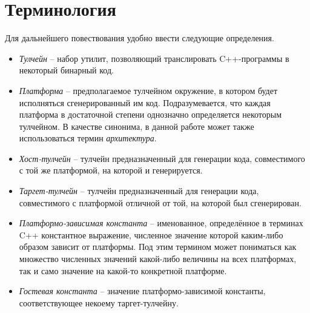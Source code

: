 \section{Терминология}
Для дальнейшего повествования удобно ввести следующие определения.

\begin{itemize}
    \item
        \textit{Тулчейн} -- набор утилит, позволяющий транслировать C++-программы в некоторый бинарный код.
    \item
        \textit{Платформа} -- предполагаемое тулчейном окружение, в котором будет исполняться сгенерированный им код. Подразумевается, что каждая платформа в достаточной степени однозначно определяется некоторым тулчейном. В качестве синонима, в данной работе может также использоваться термин \textit{архитектура}.
    \item
        \textit{Хост-тулчейн} -- тулчейн предназначенный для генерации кода, совместимого с той же платформой, на которой и генерируется.
    \item
        \textit{Таргет-тулчейн} -- тулчейн предназначенный для генерации кода, совместимого с платформой отличной от той, на которой был сгенерирован.
    \item
        \textit{Платформо-зависимая константа} -- именованное, определённое в терминах C++ константное выражение, численное значение которой каким-либо образом зависит от платформы. Под этим термином может пониматься как множество численных значений какой-либо величины на всех платформах, так и само значение на какой-то конкретной платформе.
    \item
        \textit{Гостевая константа} -- значение платформо-зависимой константы, соответствующее некоему таргет-тулчейну.
\end{itemize}

\newpage